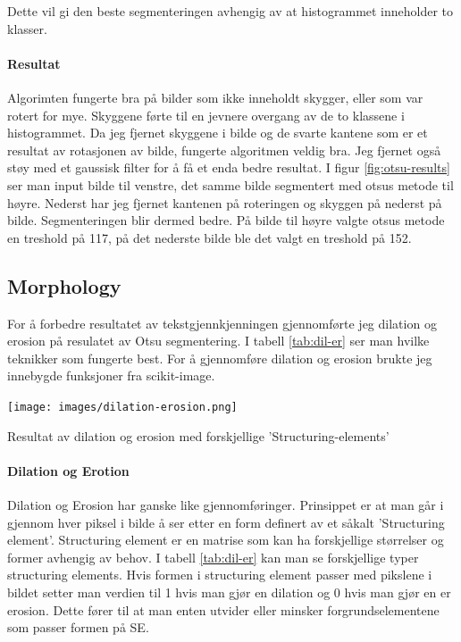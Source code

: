 \documentclass{article}
\begin{document}
Dette vil gi den beste segmenteringen avhengig av at histogrammet inneholder to klasser.

\paragraph{Resultat}
Algorimten fungerte bra på bilder som ikke inneholdt skygger, eller som var rotert for mye. Skyggene førte til en jevnere overgang av de to klassene i histogrammet. Da jeg fjernet skyggene i bilde og de svarte kantene som er et resultat av rotasjonen av bilde, fungerte algoritmen veldig bra. Jeg fjernet også støy med et gaussisk filter for å få et enda bedre resultat. I figur \ref{fig:otsu-results} ser man input bilde til venstre, det samme bilde segmentert med otsus metode til høyre. Nederst har jeg fjernet kantenen på roteringen og skyggen på nederst på bilde. Segmenteringen blir dermed bedre. På bilde til høyre valgte otsus metode en treshold på 117, på det nederste bilde ble det valgt en treshold på 152.


\subsection{Morphology}
For å forbedre resultatet av tekstgjennkjenningen gjennomførte jeg  dilation og erosion på resulatet av Otsu segmentering. I tabell \ref{tab:dil-er} ser man hvilke teknikker som fungerte best. For å gjennomføre dilation og erosion brukte jeg innebygde funksjoner fra scikit-image.
\begin{table}[h]
\centering
\texttt{[image: images/dilation-erosion.png]}
\caption{Resultat av dilation og erosion med forskjellige 'Structuring-elements'}
\label{tab:dil-er}
\end{table}

\paragraph{Dilation og Erotion}
Dilation og Erosion har ganske like gjennomføringer. Prinsippet er at man går i gjennom hver piksel i bilde å ser etter en form definert av et såkalt 'Structuring element'. Structuring element er en matrise som kan ha forskjellige størrelser og former avhengig av behov. I tabell \ref{tab:dil-er} kan man se forskjellige typer structuring elements. Hvis formen i structuring element passer med pikslene i bildet setter man verdien til 1 hvis man gjør en dilation og 0 hvis man gjør en er erosion. Dette fører til at man enten utvider eller minsker forgrundselementene som passer formen på SE.
\end{document}
